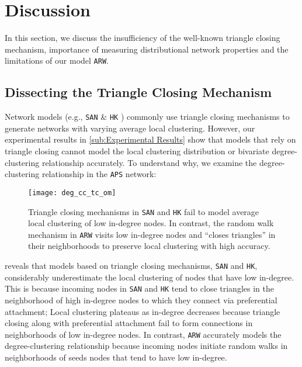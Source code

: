 
\section{Discussion}
\label{sec:Discussion}
In this section, we discuss the insufficiency of the well-known triangle closing mechanism,
importance of measuring distributional network properties
and the limitations of our model \texttt{ARW}.

\subsection{Dissecting the Triangle Closing Mechanism}
\label{ss:tc}

Network models (e.g., \texttt{SAN} \cite{gong2012evolution} \& \texttt{HK} \cite{holme2002growing})
commonly use triangle closing mechanisms to generate networks with
varying average local clustering. However, our experimental results
in \cref{sub:Experimental Results} show that models that rely on triangle closing
cannot model the local clustering distribution or bivariate degree-clustering
relationship accurately. To understand why, we examine the degree-clustering
relationship in the \texttt{APS} network:
\begin{figure}[h]
    \centering
    \vspace{-7pt}
    \texttt{[image: deg\_cc\_tc\_om]}
    \caption{Triangle closing mechanisms in \texttt{SAN} and \texttt{HK} fail to
    model average local clustering of low in-degree nodes. In contrast, the random walk
    mechanism in \texttt{ARW} visits low in-degree nodes and ``closes triangles'' in
    their neighborhoods to preserve local clustering with high accuracy.}
    \label{fig:triangle_closing}
\end{figure}

 reveals that models based on triangle closing mechanisms,
\texttt{SAN} and \texttt{HK}, considerably underestimate the local clustering of
nodes that have low in-degree. This is because incoming nodes in \texttt{SAN} and \texttt{HK}
tend to close triangles in the neighborhood of high in-degree nodes to which they
connect via preferential attachment; Local clustering plateaus as in-degree decreases because
triangle closing along with preferential attachment fail to form connections in neighborhoods
of low in-degree nodes. In contrast, \texttt{ARW} accurately models the degree-clustering relationship
because incoming nodes initiate random walks in neighborhoods of seeds nodes that tend to have
low in-degree.

